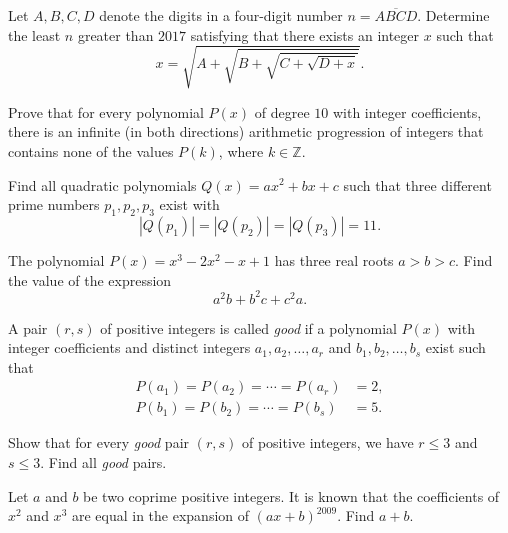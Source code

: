 \documentclass[12pt,a4paper]{memoir}
\theoremstyle{definition}
\begin{document}
\begin{question}[name={2017 Denmark (Georg Mohr)}]
	Let $A,B,C,D$ denote the digits in a four-digit number $n=\overline{ABCD}$. Determine the least $n$ greater than $2017$ satisfying that there exists an integer $x$ such that \[x=\sqrt{A+\sqrt{B+\sqrt{C+\sqrt{D+x}}}}.\]
\end{question}


\begin{question}[name={1999 Switzerland TST}]
	Prove that for every polynomial $P(x)$ of degree $10$ with integer coefficients, there is an infinite (in both directions) arithmetic progression of integers that contains none of the values $P(k)$, where $k\in\mathbb Z$.
\end{question}


\begin{question}[name={2003 Switzerland TST}]
	Find all quadratic polynomials $Q(x)=ax^2+bx+c$ such that three different prime numbers $p_1, p_2, p_3$ exist with
	\[|Q(p_1)|=|Q(p_2)|=|Q(p_3)|=11.\]
\end{question}


\begin{question}[name={2006 Switzerland TST}]
	The polynomial $P(x)=x^3-2x^2-x+1$ has three real roots $a>b>c$. Find the value of the expression
	\[a^2b+b^2c+c^2a.\]
\end{question}


\begin{question}[name={2007 Switzerland TST}]
	A pair $(r, s)$ of positive integers is called \textit{good} if a polynomial $P(x)$ with integer coefficients and distinct integers $a_1, a_2,\dots , a_r$ and $b_1, b_2,\dots, b_s$ exist such that
	\begin{align*}
		P(a_1)=P(a_2)=\cdots = P(a_r) &= 2,\\
		P(b_1)=P(b_2)=\cdots = P(b_s) &= 5.
	\end{align*}
	\begin{tasks}
		\task Show that for every \textit{good} pair $(r, s)$ of positive integers, we have $r \leq 3$ and $s \leq 3$.
		\task Find all \textit{good} pairs.
	\end{tasks}
\end{question}

\begin{question}[name={2009 Ecuador TST}]
	Let $a$ and $b$ be two coprime positive integers. It is known that the coefficients of $x^2$ and $x^3$ are equal in the expansion of $(ax+b)^{2009}$. Find $a+b$.
\end{question}
\end{document}
